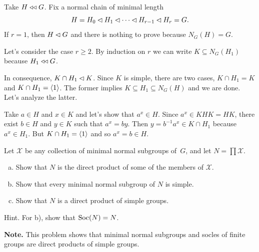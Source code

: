 \begin{solution} Take $H\mathrel{\triangleleft\triangleleft} G$. Fix a normal chain of minimal length
$$
    H=H_0\lhd H_1\lhd\cdots\lhd H_{r-1}\lhd H_r=G.
$$
If $r=1$, then $H\lhd G$ and there is nothing to prove because $N_G(H)=G$.

Let's consider the case $r\ge2$. By induction on $r$ we can write $K\subseteq N_G(H_1)$ because $H_1\mathrel{\triangleleft\triangleleft} G$.

In consequence, $K\cap H_1\lhd K$. Since $K$ is simple, there are two cases, $K\cap H_1=K$ and $K\cap H_1=\langle1\rangle$. The former implies $K\subseteq H_1\subseteq N_G(H)$ and we are done. Let's analyze the latter.

Take $a\in H$ and $x\in K$ and let's show that $a^x\in H$. Since $a^x \in KHK=HK$, there exist $b\in H$ and $y\in K$ such that $a^x=by$. Then $y=b^{-1}a^x\in K\cap H_1$ because $a^x\in H_1$. But $K\cap H_1=\langle1\rangle$ and so $a^x=b\in H$.  \end{solution}

\begin{probl}\label{problem-2.A.5}
    Let $\mathcal X$ be any collection of minimal normal subgroups of\/~$G$, and let\/ $N = \prod\mathcal X$.
    \begin{enumerate}[a),font=\upshape]
    \item Show that\/ $N$ is the direct product of some of the members of\/ $\mathcal X$.
    \item Show that every minimal normal subgroup of\/ $N$ is simple.
    \item Show that\/ $N$ is a direct product of simple groups.
    \end{enumerate}
    \textrm{\upshape Hint. For b), show that ${\rm Soc}(N) = N$.}

    \textrm{\upshape\textbf{Note.} This problem shows that minimal normal subgroups and socles of finite groups are direct products of simple groups.}
\end{probl}


